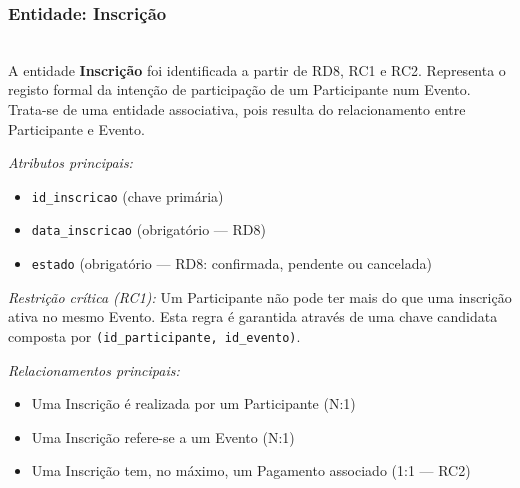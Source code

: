 \documentclass[runningheads]{llncs}
\begin{document}
                \vspace{0.4cm}
                \noindent\begin{minipage}{\textwidth}
                \subsubsection{Entidade: Inscrição}\mbox{}\\
                A entidade \textbf{Inscrição} foi identificada a partir de RD8, RC1 e RC2. Representa
                o registo formal da intenção de participação de um Participante num Evento. Trata-se
                de uma entidade associativa, pois resulta do relacionamento entre Participante e Evento.

                \vspace{0.2cm}
                \noindent\textit{Atributos principais:}
                \begin{itemize}
                    \item \texttt{id\_inscricao} (chave primária)
                    \item \texttt{data\_inscricao} (obrigatório --- RD8)
                    \item \texttt{estado} (obrigatório --- RD8: confirmada, pendente ou cancelada)
                \end{itemize}

                \vspace{0.2cm}
                \noindent\textit{Restrição crítica (RC1):} Um Participante não pode ter mais do que uma inscrição
                ativa no mesmo Evento. Esta regra é garantida através de uma chave candidata composta
                por \texttt{(id\_participante, id\_evento)}.

                \vspace{0.2cm}
                \noindent\textit{Relacionamentos principais:}
                \begin{itemize}
                    \item Uma Inscrição é realizada por um Participante (N:1)
                    \item Uma Inscrição refere-se a um Evento (N:1)
                    \item Uma Inscrição tem, no máximo, um Pagamento associado (1:1 --- RC2)
                \end{itemize}
                \end{minipage}
\end{document}
